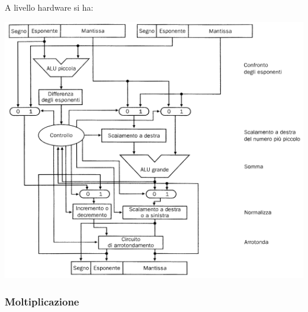 \documentclass[a4paper,12pt, oneside]{book}
\begin{document}
\newpage
A livello hardware si ha:
\begin{center}
\includegraphics[scale = 0.9]{img/sum2.png}
\end{center}
\newpage
\subsubsection{Moltiplicazione}
\end{document}
